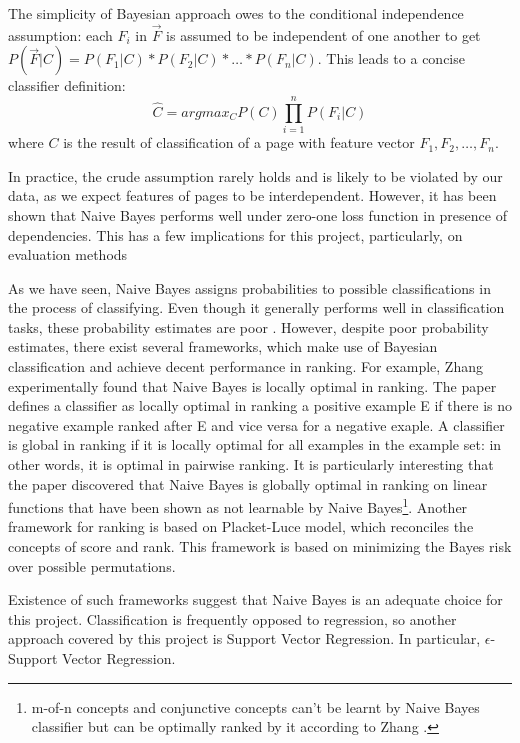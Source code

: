 \documentclass[12pt,twoside,notitlepage]{report}
\begin{document}
The simplicity of Bayesian approach owes to the conditional independence
assumption: each \(F_i\) in \(\vec{F}\) is assumed to be independent of one
another to get \(P(\vec{F}|C)=P(F_1|C)*P(F_2|C)*\dots*P(F_n|C)\). This leads to a concise classifier definition:
\begin{equation}
\hat{C}= argmax_C P(C)\prod_{i=1}^{n}P(F_i|C)
\end{equation}
where \(C\) is the result of classification of a page with feature vector
\(F_1,F_2,\dots,F_n\).

In practice, the crude assumption rarely  holds and is likely to
be violated by our data, as we expect features of pages to be interdependent.
However, it has been shown that Naive Bayes performs well under zero-one loss
function in presence of dependencies\cite{OPTIM}. This has a few
implications for this project, particularly, on evaluation methods 

As we have seen, Naive Bayes assigns probabilities to possible classifications
in the process of classifying. Even though it generally performs well in
classification tasks, these probability estimates are poor \cite{domingos96}.
However, despite poor probability estimates, there exist several frameworks,
which make use of Bayesian classification and achieve decent performance in
ranking. For example, Zhang \cite{zhang04} experimentally found that Naive
Bayes is locally optimal in ranking. The paper defines a classifier as locally
optimal in ranking a positive example E if there is no negative example ranked
after E and vice versa for a negative exaple. A classifier is global in ranking
if it is locally optimal for all examples in the example set: in other words,
it is optimal in pairwise ranking.  It is particularly interesting that the
paper discovered that Naive Bayes is globally optimal in ranking on linear
functions that have been shown as not learnable by Naive Bayes\footnote{m-of-n
concepts and conjunctive concepts can't be learnt by Naive Bayes classifier but
can be optimally ranked by it according to Zhang \cite{zhang04}.}.
Another framework for ranking \cite{bayesrank} is based on Placket-Luce model, which reconciles
the concepts of score and rank. This framework is based on minimizing the Bayes
risk over possible permutations.

Existence of such frameworks suggest that Naive Bayes is an adequate choice
for this project. Classification is frequently opposed to regression, so
another approach covered by this project is Support Vector Regression. In
particular, \(\epsilon\)-Support Vector Regression.
\end{document}
